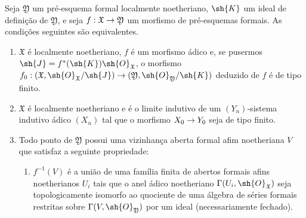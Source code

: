 \documentclass[oneside]{amsart}
\makeatletter
\newcommand{\ega@arrow}[2]{\mathchoice{#1}{#2}{#2}{#2}}
\renewcommand{\to}{\ega@arrow{\longrightarrow}{\rightarrow}}
\newcommand{\oldpage}[2][]{{\marginnote{\normalfont\textbf{#1}~|~#2}}\ignorespaces}
\let\EGAOriginalLabel\label
\renewcommand{\label}[1]{\phantomsection\EGAOriginalLabel{#1}}
\makeatother
\begin{document}
\begin{proposition}[10.13.1]
\label{I.10.13.1}
Seja $\mathfrak{Y}$ um pré-esquema formal localmente noetheriano, $\sh{K}$ um ideal de definição de $\mathfrak{Y}$, e seja $f:\mathfrak{X}\to\mathfrak{Y}$ um morfismo de pré-esquemas formais.
As condições seguintes são equivalentes.
\begin{enumerate}
  \item[\rm{(a)}] $\mathfrak{X}$ é localmente noetheriano, $f$ é um morfismo ádico  e, se pusermos $\sh{J}=f^*(\sh{K})\sh{O}_\mathfrak{X}$, o morfismo $f_0:(\mathfrak{X},\sh{O}_\mathfrak{X}/\sh{J})\to(\mathfrak{Y},\sh{O}_\mathfrak{Y}/\sh{K})$ deduzido de $f$ é de tipo finito.
  \item[\rm{(b)}] $\mathfrak{X}$ é localmente noetheriano e é o limite indutivo de um $(Y_n)$-sistema indutivo ádico $(X_n)$ tal que o morfismo $X_0\to Y_0$ seja de tipo finito.
\oldpage[I]{208}
  \item[\rm{(c)}] Todo ponto de $\mathfrak{Y}$ possui uma vizinhança aberta formal afim noetheriana $V$ que satisfaz a seguinte propriedade:
\begin{enumerate}
  \item[(\textbf{Q})] $f^{-1}(V)$ é a união de uma família finita de abertos formais afins noetherianos $U_i$ tais que o anel ádico noetheriano $\Gamma(U_i,\sh{O}_\mathfrak{X})$ seja topologicamente isomorfo ao quociente de uma álgebra de séries formais restritas  sobre $\Gamma(V,\sh{O}_\mathfrak{Y})$ por um ideal (necessariamente fechado).
\end{enumerate}
\end{enumerate}
\end{proposition}
\end{document}
